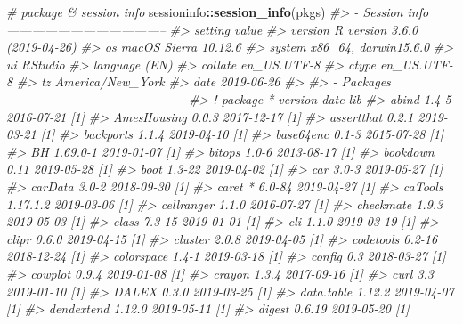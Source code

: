 \documentclass[]{krantz}
\makeatletter
\newenvironment{Shaded}{\begin{snugshade}}{\end{snugshade}}
\newcommand{\CommentTok}[1]{\textcolor[rgb]{0.37,0.37,0.37}{\textit{#1}}}
\newcommand{\KeywordTok}[1]{\textcolor[rgb]{0.27,0.27,0.27}{\textbf{#1}}}
\newcommand{\NormalTok}[1]{#1}
\newcommand{\OperatorTok}[1]{\textcolor[rgb]{0.43,0.43,0.43}{\textbf{#1}}}
\newenvironment{kframe}{%
\medskip{}
\setlength{\fboxsep}{.8em}
 \def\at@end@of@kframe{}%
 \ifinner\ifhmode%
  \def\at@end@of@kframe{\end{minipage}}%
  \begin{minipage}{\columnwidth}%
 \fi\fi%
 \def\FrameCommand##1{\hskip\@totalleftmargin \hskip-\fboxsep
 \colorbox{shadecolor}{##1}\hskip-\fboxsep
     \hskip-\linewidth \hskip-\@totalleftmargin \hskip\columnwidth}%
 \MakeFramed {\advance\hsize-\width
   \@totalleftmargin\z@ \linewidth\hsize
   \@setminipage}}%
 {\par\unskip\endMakeFramed%
 \at@end@of@kframe}
\renewenvironment{Shaded}{\begin{kframe}}{\end{kframe}}
\makeatother
\begin{document}
\begin{Shaded}
\begin{Highlighting}[]
\CommentTok{# package & session info}
\NormalTok{sessioninfo}\OperatorTok{::}\KeywordTok{session_info}\NormalTok{(pkgs)}
\CommentTok{#> - Session info --------------------------------------}
\CommentTok{#>  setting  value                       }
\CommentTok{#>  version  R version 3.6.0 (2019-04-26)}
\CommentTok{#>  os       macOS Sierra 10.12.6        }
\CommentTok{#>  system   x86_64, darwin15.6.0        }
\CommentTok{#>  ui       RStudio                     }
\CommentTok{#>  language (EN)                        }
\CommentTok{#>  collate  en_US.UTF-8                 }
\CommentTok{#>  ctype    en_US.UTF-8                 }
\CommentTok{#>  tz       America/New_York            }
\CommentTok{#>  date     2019-06-26                  }
\CommentTok{#> }
\CommentTok{#> - Packages ------------------------------------------}
\CommentTok{#>  ! package       * version    date       lib}
\CommentTok{#>    abind           1.4-5      2016-07-21 [1]}
\CommentTok{#>    AmesHousing     0.0.3      2017-12-17 [1]}
\CommentTok{#>    assertthat      0.2.1      2019-03-21 [1]}
\CommentTok{#>    backports       1.1.4      2019-04-10 [1]}
\CommentTok{#>    base64enc       0.1-3      2015-07-28 [1]}
\CommentTok{#>    BH              1.69.0-1   2019-01-07 [1]}
\CommentTok{#>    bitops          1.0-6      2013-08-17 [1]}
\CommentTok{#>    bookdown        0.11       2019-05-28 [1]}
\CommentTok{#>    boot            1.3-22     2019-04-02 [1]}
\CommentTok{#>    car             3.0-3      2019-05-27 [1]}
\CommentTok{#>    carData         3.0-2      2018-09-30 [1]}
\CommentTok{#>    caret         * 6.0-84     2019-04-27 [1]}
\CommentTok{#>    caTools         1.17.1.2   2019-03-06 [1]}
\CommentTok{#>    cellranger      1.1.0      2016-07-27 [1]}
\CommentTok{#>    checkmate       1.9.3      2019-05-03 [1]}
\CommentTok{#>    class           7.3-15     2019-01-01 [1]}
\CommentTok{#>    cli             1.1.0      2019-03-19 [1]}
\CommentTok{#>    clipr           0.6.0      2019-04-15 [1]}
\CommentTok{#>    cluster         2.0.8      2019-04-05 [1]}
\CommentTok{#>    codetools       0.2-16     2018-12-24 [1]}
\CommentTok{#>    colorspace      1.4-1      2019-03-18 [1]}
\CommentTok{#>    config          0.3        2018-03-27 [1]}
\CommentTok{#>    cowplot         0.9.4      2019-01-08 [1]}
\CommentTok{#>    crayon          1.3.4      2017-09-16 [1]}
\CommentTok{#>    curl            3.3        2019-01-10 [1]}
\CommentTok{#>    DALEX           0.3.0      2019-03-25 [1]}
\CommentTok{#>    data.table      1.12.2     2019-04-07 [1]}
\CommentTok{#>    dendextend      1.12.0     2019-05-11 [1]}
\CommentTok{#>    digest          0.6.19     2019-05-20 [1]}

\end{Highlighting}
\end{Shaded}
\end{document}
